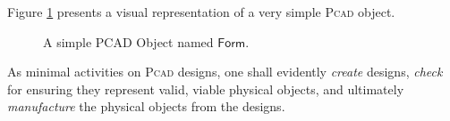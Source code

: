\begin{Example}[PCAD]
   Figure \ref{fig:PCAD-Visual} presents a visual representation of a very 
simple \textsc{Pcad} object. 

\begin{figure}[t]
   \centering
   \caption{A simple PCAD Object named $\mathsf{Form}$.}%
   \label{fig:PCAD-Visual}%
\end{figure}
\end{Example}

As minimal activities on \textsc{Pcad} designs, one shall evidently 
\emph{create} designs, \emph{check} for ensuring they represent valid, viable 
physical objects, and ultimately \emph{manufacture} the physical objects from 
the designs.


% 
% 
% 
% 
% 
% 
% 






